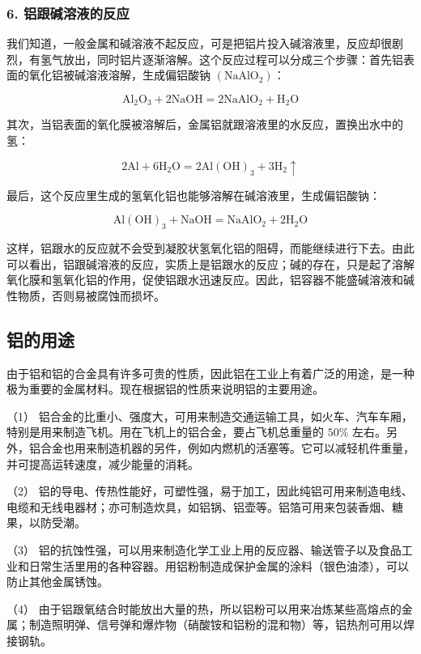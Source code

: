 \subsubsection{6. 铝跟碱溶液的反应}

我们知道，一般金属和碱溶液不起反应，可是把铝片投入碱溶液里，反应却很剧烈，有氢气放出，同时铝片逐渐溶解。这个反应过程可以分成三个步骤：首先铝表面的氧化铝被碱溶液溶解，生成偏铝酸钠
\(\left(\mathrm{NaAlO}_{2}\right)\)：

\[
\mathrm{Al} _ {2} \mathrm{O} _ {3} + 2 \mathrm{NaOH} = 2 \mathrm{NaAlO} _ {2} + \mathrm{H} _ {2} \mathrm{O}
\]

其次，当铝表面的氧化膜被溶解后，金属铝就跟溶液里的水反应，置换出水中的氢：

\[
2 \mathrm{Al} + 6 \mathrm{H} _ {2} \mathrm{O} = 2 \mathrm{Al} (\mathrm{OH}) _ {3} + 3 \mathrm{H} _ {2} \uparrow
\]

最后，这个反应里生成的氢氧化铝也能够溶解在碱溶液里，生成偏铝酸钠：

\[
\mathrm{Al} (\mathrm{OH}) _ {3} + \mathrm{NaOH} = \mathrm{NaAlO} _ {2} + 2 \mathrm{H} _ {2} \mathrm{O}
\]

这样，铝跟水的反应就不会受到凝胶状氢氧化铝的阻碍，而能继续进行下去。由此可以看出，铝跟碱溶液的反应，实质上是铝跟水的反应；碱的存在，只是起了溶解氧化膜和氢氧化铝的作用，促使铝跟水迅速反应。因此，铝容器不能盛碱溶液和碱性物质，否则易被腐蚀而损坏。

\subsection{铝的用途}

由于铝和铝的合金具有许多可贵的性质，因此铝在工业上有着广泛的用途，是一种极为重要的金属材料。现在根据铝的性质来说明铝的主要用途。

（1）
铝合金的比重小、强度大，可用来制造交通运输工具，如火车、汽车车厢，特别是用来制造飞机。用在飞机上的铝合金，要占飞机总重量的
\(50 \%\)
左右。另外，铝合金也用来制造机器的另件，例如内燃机的活塞等。它可以减轻机件重量，并可提高运转速度，减少能量的消耗。

（2）
铝的导电、传热性能好，可塑性强，易于加工，因此纯铝可用来制造电线、电缆和无线电器材；亦可制造炊具，如铝锅、铝壶等。铝箔可用来包装香烟、糖果，以防受潮。

（3）
铝的抗蚀性强，可以用来制造化学工业上用的反应器、输送管子以及食品工业和日常生活里用的各种容器。用铝粉制造成保护金属的涂料（银色油漆），可以防止其他金属锈蚀。

（4）
由于铝跟氧结合时能放出大量的热，所以铝粉可以用来冶炼某些高熔点的金属；制造照明弹、信号弹和爆炸物（硝酸铵和铝粉的混和物）等，铝热剂可用以焊接钢轨。

